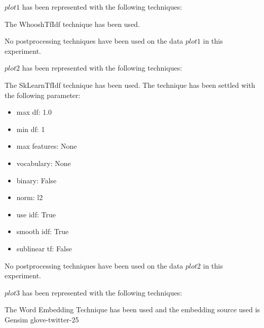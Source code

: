 \documentclass[11pt]{article}
\begin{document}
$ plot1 $  has been represented with the following techniques:
\hfill\break
\hfill\break



The WhooshTfIdf technique has been used.
\hfill\break
\hfill\break






No postprocessing techniques have been used on the data $ plot1 $ in this experiment.
\hfill\break
\hfill\break



$ plot2 $  has been represented with the following techniques:
\hfill\break
\hfill\break



The SkLearnTfIdf technique has been used.
The technique has been settled with the following parameter:
\begin{itemize}
    \item max df: 1.0
    \item min df: 1
    \item max features: None
    \item vocabulary: None
    \item binary: False
    \item norm: l2
    \item use idf: True
    \item smooth idf: True
    \item sublinear tf: False
\end{itemize}
\hfill\break
\hfill\break






No postprocessing techniques have been used on the data $ plot2 $ in this experiment.
\hfill\break
\hfill\break



$ plot3 $  has been represented with the following techniques:
\hfill\break
\hfill\break



The Word Embedding Technique has been used and
the embedding source used is
Gensim glove-twitter-25
\hfill\break
\hfill\break
\end{document}
